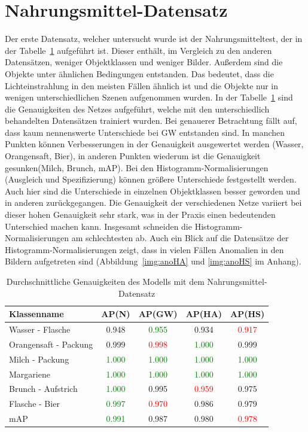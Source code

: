   \section{Nahrungsmittel-Datensatz}
Der erste Datensatz, welcher untersucht wurde ist der Nahrungsmitteltest, der in der Tabelle~\ref{tab:nahrungsmitteltest} aufgeführt ist. Dieser enthält, im Vergleich zu den anderen Datensätzen, weniger Objektklassen und weniger Bilder. Außerdem sind die Objekte unter ähnlichen Bedingungen entstanden. Das bedeutet, dass die Lichteinstrahlung in den meisten Fällen ähnlich ist und die Objekte nur in wenigen unterschiedlichen Szenen aufgenommen wurden. In der Tabelle~\ref{tab:nahrungsmitteltest} sind die Genauigkeiten des Netzes aufgeführt, welche mit den unterschiedlich behandelten Datensätzen trainiert wurden. Bei genauerer Betrachtung fällt auf, dass kaum nennenswerte Unterschiede bei GW entstanden sind. In manchen Punkten können Verbesserungen in der Genauigkeit ausgewertet werden (Wasser, Orangensaft, Bier), in anderen Punkten wiederum ist die Genauigkeit gesunken(Milch, Brunch, mAP). Bei den Histogramm-Normalisierungen (Ausgleich und Spezifizierung) können größere Unterschiede festgestellt werden. Auch hier sind die Unterschiede in einzelnen Objektklassen besser geworden und in anderen zurückgegangen. Die Genauigkeit der verschiedenen Netze variiert bei dieser hohen Genauigkeit sehr stark, was in der Praxis einen bedeutenden Unterschied machen kann. Insgesamt schneiden die Histogramm-Normalisierungen am schlechtesten ab. Auch ein Blick auf die Datensätze der Histogramm-Normalisierungen zeigt, dass in vielen Fällen Anomalien in den Bildern aufgetreten sind (Abbildung~\ref{img:anoHA} und \ref{img:anoHS} im Anhang).
\begin{table}
[h]
\caption{Durchschnittliche Genauigkeiten des Modells mit dem Nahrungsmittel-Datensatz}
\centering
\begin{tabular}{|l|c|c|c|c|}
\hline
Klassenname & AP(N) & AP(GW) & AP(HA) & AP(HS)\\
\hline
Wasser - Flasche & 0.948 & \textcolor{green}{0.955} & 0.934 & \textcolor{red}{0.917}\\
Orangensaft - Packung & 0.999 & \textcolor{red}{0.998} & \textcolor{green}{1.000} & 0.999\\
Milch - Packung & \textcolor{green}{1.000} & \textcolor{green}{1.000} & \textcolor{green}{1.000} & \textcolor{green}{1.000}\\
Margariene & \textcolor{green}{1.000} & \textcolor{green}{1.000} & \textcolor{green}{1.000} & \textcolor{green}{1.000}\\
Brunch - Aufstrich & \textcolor{green}{1.000} & 0.995 & \textcolor{red}{0.959} & 0.975\\
Flasche - Bier & \textcolor{green}{0.997} & \textcolor{red}{0.970} & 0.986 & 0.979\\
\hline
mAP & \textcolor{green}{0.991} & 0.987 & 0.980 & \textcolor{red}{0.978}\\
\hline
\end{tabular}
\label{tab:nahrungsmitteltest}
\end{table}
